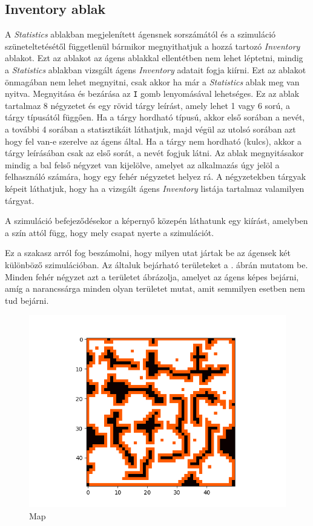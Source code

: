 \subsection{Inventory ablak}
A \textit{Statistics} ablakban megjelenített ágensnek sorszámától és a szimuláció szüneteltetésétől függetlenül bármikor megnyithatjuk a hozzá tartozó \textit{Inventory} ablakot.
Ezt az ablakot az ágens ablakkal ellentétben nem lehet léptetni, mindig a \textit{Statistics} ablakban vizsgált ágens \textit{Inventory} adatait fogja kiírni.
Ezt az ablakot önmagában nem lehet megnyitni, csak akkor ha már a \textit{Statistics} ablak meg van nyitva.
Megnyitása és bezárása az \texttt{I} gomb lenyomásával lehetséges.
Ez az ablak tartalmaz 8 négyzetet és egy rövid tárgy leírást, amely lehet 1 vagy 6 sorú, a tárgy típusától függően. Ha a tárgy hordható típusú, akkor első sorában a nevét, 
a további 4 sorában a statisztikáit láthatjuk, majd végül az utolsó sorában azt hogy fel van-e szerelve az ágens által. Ha a tárgy nem hordható (kulcs), 
akkor a tárgy leírásában csak az első sorát, a nevét fogjuk látni.
Az ablak megnyitásakor mindig a bal felső négyzet van kijelölve, amelyet az alkalmazás úgy jelöl a felhasználó számára, hogy egy fehér négyzetet helyez rá.
A négyzetekben tárgyak képeit láthatjuk, hogy ha a vizsgált ágens \textit{Inventory} listája tartalmaz valamilyen tárgyat.


A szimuláció befejeződésekor a képernyő közepén láthatunk egy kiírást, amelyben a szín attól függ, hogy mely csapat nyerte a szimulációt.


Ez a szakasz arról fog beszámolni, hogy milyen utat jártak be az ágensek két különböző szimulációban. Az általuk bejárható területeket a . ábrán mutatom be. Minden fehér négyzet azt a területet ábrázolja, amelyet az ágens képes bejárni, amíg a narancssárga minden olyan területet mutat, amit semmilyen esetben nem tud bejárni. 

\begin{figure}[!ht]
    \centering
    \includegraphics[scale=0.7]{images/map.png}
    \caption{Map}
    \label{fig:map}
\end{figure}

